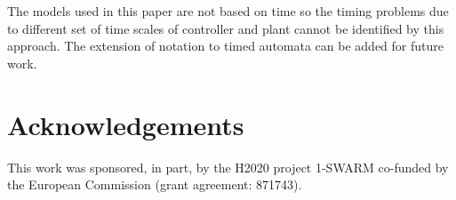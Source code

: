 \documentclass[conference]{IEEEtran}
\begin{document}
The models used in this paper are not based on time so the timing problems due to different set of time scales of controller and plant cannot be identified by this approach. The extension of notation to timed automata can be added for future work.

\section{Acknowledgements}
This work was sponsored, in part, by the H2020 project 1-SWARM co-funded by the European Commission (grant agreement: 871743).  



\end{document}

